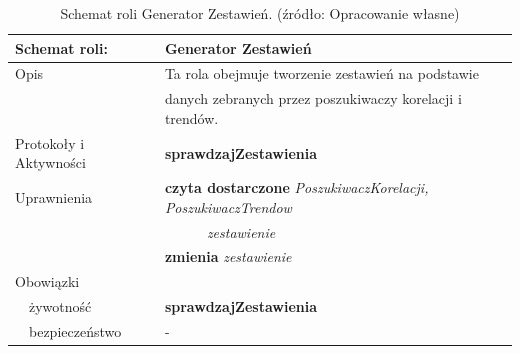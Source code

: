 \documentclass[11pt]{report}
\begin{document}
    \begin{table}[ht!]
        \begin{tabular}{ll}
            Schemat roli:          & Generator Zestawień                                                          \\ \hline
            Opis                   & Ta rola obejmuje tworzenie zestawień na podstawie                            \\
            & danych zebranych przez poszukiwaczy korelacji i trendów.                     \\
            Protokoły i Aktywności & \textbf{sprawdzajZestawienia}                                                \\
            Uprawnienia            & \textbf{czyta dostarczone} \textit{PoszukiwaczKorelacji, PoszukiwaczTrendow} \\
            & ~~~~~~\textit{zestawienie}                                                   \\
            & \textbf{zmienia} \textit{zestawienie}                                        \\
            Obowiązki              &                                                                              \\
            ~~żywotność            & \textbf{sprawdzajZestawienia}                                                \\
            ~~bezpieczeństwo       & -                                                                            \\
        \end{tabular}
        \caption{Schemat roli Generator Zestawień. (źródło: Opracowanie własne)}
        \label{tab:schemat roli Generator Zestawień}
    \end{table}
\end{document}
